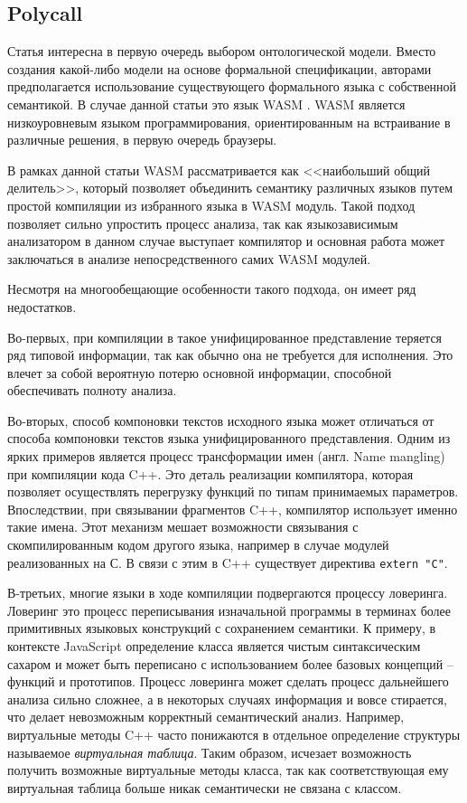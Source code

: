 \subsection{Polycall} \label{ssec:polycall}

Статья \cite{polycall} интересна в первую очередь выбором онтологической модели. Вместо создания 
какой-либо модели на основе формальной спецификации, авторами предполагается использование
существующего формального языка с собственной семантикой. В случае данной статьи это язык WASM \cite{wasm}.
WASM является низкоуровневым языком программирования, ориентированным на встраивание в различные решения, в первую очередь 
браузеры.

В рамках данной статьи WASM рассматривается как <<наибольший общий делитель>>, который позволяет объединить
семантику различных языков путем простой компиляции из избранного языка в WASM модуль. Такой подход позволяет
сильно упростить процесс анализа, так как языкозависимым анализатором в данном случае выступает компилятор и
основная работа может заключаться в анализе непосредственного самих WASM модулей.

Несмотря на многообещающие особенности такого подхода, он имеет ряд недостатков. 

Во-первых, при компиляции в такое унифицированное представление теряется ряд типовой информации, так как обычно она не требуется для исполнения.
Это влечет за собой вероятную потерю основной информации, способной обеспечивать полноту анализа. 

Во-вторых, способ компоновки текстов исходного языка может отличаться от способа компоновки текстов языка унифицированного представления.
Одним из ярких примеров является процесс трансформации имен (англ. Name mangling) при компиляции кода C++. Это деталь реализации
компилятора, которая позволяет осуществлять перегрузку функций по типам принимаемых параметров. Впоследствии, при связывании
фрагментов C++, компилятор использует именно такие имена. Этот механизм мешает возможности связывания с скомпилированным кодом
другого языка, например в случае модулей реализованных на С. В связи с этим в C++ существует директива \texttt{extern "C"}.

В-третьих, многие языки в ходе компиляции подвергаются процессу ловеринга. Ловеринг это процесс переписывания изначальной программы
в терминах более примитивных языковых конструкций с сохранением семантики. К примеру, в контексте JavaScript определение
класса является чистым синтаксическим сахаром и может быть переписано с использованием более базовых концепций -- функций и прототипов.
Процесс ловеринга может сделать процесс дальнейшего анализа сильно сложнее, а в некоторых случаях информация и вовсе стирается, что
делает невозможным корректный семантический анализ. Например, виртуальные методы C++ часто понижаются в отдельное определение
структуры называемое \textit{виртуальная таблица}. Таким образом, исчезает возможность получить возможные виртуальные методы
класса, так как соответствующая ему виртуальная таблица больше никак семантически не связана с классом.

